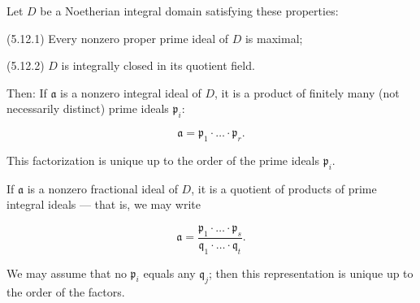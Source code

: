 Let $D$ be a Noetherian integral domain satisfying these properties:

(5.12.1) Every nonzero proper prime ideal of $D$ is maximal;

(5.12.2) $D$ is integrally closed in its quotient field.

Then: If $\mathfrak{a}$ is a nonzero integral ideal of $D$, it is a product of finitely many (not necessarily distinct) prime ideals $\mathfrak{p}_i$:

$$\mathfrak{a} = \mathfrak{p}_1 \cdot \ldots \cdot \mathfrak{p}_r.$$

This factorization is unique up to the order of the prime ideals $\mathfrak{p}_i$.

If $\mathfrak{a}$ is a nonzero fractional ideal of $D$, it is a quotient of products of prime integral ideals — that is, we may write

$$\mathfrak{a} = \frac{\mathfrak{p}_1 \cdot \ldots \cdot \mathfrak{p}_s}{\mathfrak{q}_1 \cdot \ldots \cdot \mathfrak{q}_t}.$$

We may assume that no $\mathfrak{p}_i$ equals any $\mathfrak{q}_j$; then this representation is unique up to the order of the factors.
